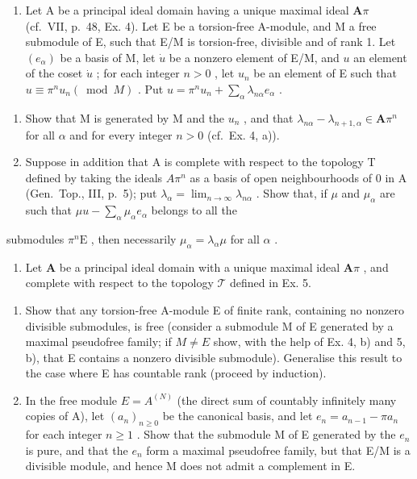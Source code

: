 \begin{enumerate}
\def\labelenumi{\arabic{enumi})}
\setcounter{enumi}{4}
\tightlist
\item
  Let A be a principal ideal domain having a unique maximal ideal \(\mathbf{A}\pi\) (cf.~VII, p.~48, Ex. 4). Let E be a torsion-free A-module, and M a free submodule of E, such that E/M is torsion-free, divisible and of rank 1. Let \((e_{\alpha})\) be a basis of M, let \(\dot{u}\) be a nonzero element of E/M, and \(u\) an element of the coset \(\dot{u}\) ; for each integer \(n > 0\) , let \(u_{n}\) be an element of E such that \(u \equiv \pi^{n} u_{n} (\bmod M)\) . Put \(u = \pi^{n} u_{n} + \sum_{\alpha} \lambda_{n\alpha} e_{\alpha}\) .
\end{enumerate}

\begin{enumerate}
\def\labelenumi{\alph{enumi})}
\item
  Show that M is generated by M and the \(u_{n}\) , and that \(\lambda_{n\alpha} - \lambda_{n + 1,\alpha} \in \mathbf{A}\pi^n\) for all \(\alpha\) and for every integer \(n > 0\) (cf.~Ex. 4, a)).
\item
  Suppose in addition that A is complete with respect to the topology T defined by taking the ideals \(A\pi^{n}\) as a basis of open neighbourhoods of 0 in A (Gen.~Top., III, p.~5); put \(\lambda_{\alpha} = \lim_{n \to \infty} \lambda_{n\alpha}\) . Show that, if \(\mu\) and \(\mu_{\alpha}\) are such that \(\mu u - \sum_{\alpha} \mu_{\alpha} e_{\alpha}\) belongs to all the
\end{enumerate}

submodules \(\pi^n\mathrm{E}\) , then necessarily \(\mu_{\alpha} = \lambda_{\alpha}\mu\) for all \(\alpha\) .

\begin{enumerate}
\def\labelenumi{\arabic{enumi})}
\setcounter{enumi}{5}
\tightlist
\item
  Let \(\mathbf{A}\) be a principal ideal domain with a unique maximal ideal \(\mathbf{A}\pi\) , and complete with respect to the topology \(\mathcal{T}\) defined in Ex. 5.
\end{enumerate}

\begin{enumerate}
\def\labelenumi{\alph{enumi})}
\item
  Show that any torsion-free A-module E of finite rank, containing no nonzero divisible submodules, is free (consider a submodule M of E generated by a maximal pseudofree family; if \(M \neq E\) show, with the help of Ex. 4, b) and 5, b), that E contains a nonzero divisible submodule). Generalise this result to the case where E has countable rank (proceed by induction).
\item
  In the free module \(E = A^{(N)}\) (the direct sum of countably infinitely many copies of A), let \((a_{n})_{n \geq 0}\) be the canonical basis, and let \(e_{n} = a_{n-1} - \pi a_{n}\) for each integer \(n \geq 1\) . Show that the submodule M of E generated by the \(e_{n}\) is pure, and that the \(e_{n}\) form a maximal pseudofree family, but that E/M is a divisible module, and hence M does not admit a complement in E.
\end{enumerate}

